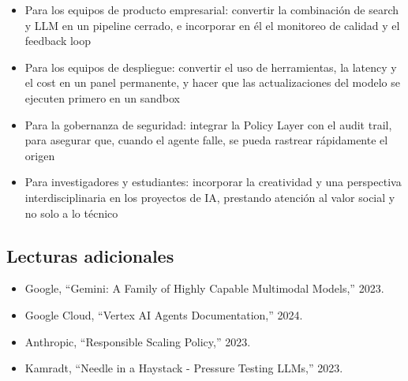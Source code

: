 \documentclass[a4paper]{article}
\begin{document}
\begin{itemize}
    \item Para los equipos de producto empresarial: convertir la combinación de search y LLM en un pipeline cerrado, e incorporar en él el monitoreo de calidad y el feedback loop
    \item Para los equipos de despliegue: convertir el uso de herramientas, la latency y el cost en un panel permanente, y hacer que las actualizaciones del modelo se ejecuten primero en un sandbox
    \item Para la gobernanza de seguridad: integrar la Policy Layer con el audit trail, para asegurar que, cuando el agente falle, se pueda rastrear rápidamente el origen
    \item Para investigadores y estudiantes: incorporar la creatividad y una perspectiva interdisciplinaria en los proyectos de IA, prestando atención al valor social y no solo a lo técnico
\end{itemize}

\subsection{Lecturas adicionales}

\begin{itemize}
    \item Google, ``Gemini: A Family of Highly Capable Multimodal Models,'' 2023.
    \item Google Cloud, ``Vertex AI Agents Documentation,'' 2024.
    \item Anthropic, ``Responsible Scaling Policy,'' 2023.
    \item Kamradt, ``Needle in a Haystack - Pressure Testing LLMs,'' 2023.
\end{itemize}
\end{document}
